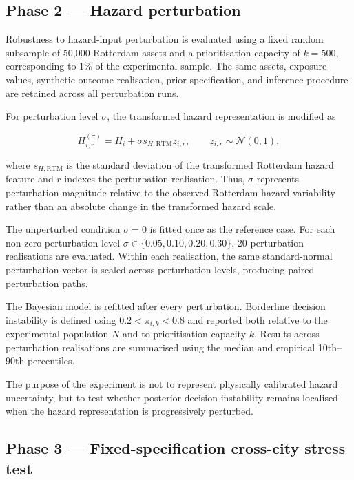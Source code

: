 \documentclass[
]{article}
\begin{document}
\subsection{Phase 2 --- Hazard
perturbation}\label{phase-2-hazard-perturbation}

Robustness to hazard-input perturbation is evaluated using a fixed
random subsample of 50,000 Rotterdam assets and a prioritisation
capacity of \(k=500\), corresponding to 1\% of the experimental sample.
The same assets, exposure values, synthetic outcome realisation, prior
specification, and inference procedure are retained across all
perturbation runs.

For perturbation level \(\sigma\), the transformed hazard representation
is modified as

\[
H_{i,r}^{(\sigma)}
=
H_i
+
\sigma s_{H,\mathrm{RTM}} z_{i,r},
\qquad
z_{i,r}\sim\mathcal{N}(0,1),
\]

where \(s_{H,\mathrm{RTM}}\) is the standard deviation of the
transformed Rotterdam hazard feature and \(r\) indexes the perturbation
realisation. Thus, \(\sigma\) represents perturbation magnitude relative
to the observed Rotterdam hazard variability rather than an absolute
change in the transformed hazard scale.

The unperturbed condition \(\sigma=0\) is fitted once as the reference
case. For each non-zero perturbation level
\(\sigma\in\{0.05,0.10,0.20,0.30\}\), 20 perturbation realisations are
evaluated. Within each realisation, the same standard-normal
perturbation vector is scaled across perturbation levels, producing
paired perturbation paths.

The Bayesian model is refitted after every perturbation. Borderline
decision instability is defined using \(0.2 < \pi_{i,k} < 0.8\) and
reported both relative to the experimental population \(N\) and to
prioritisation capacity \(k\). Results across perturbation realisations
are summarised using the median and empirical 10th--90th percentiles.

The purpose of the experiment is not to represent physically calibrated
hazard uncertainty, but to test whether posterior decision instability
remains localised when the hazard representation is progressively
perturbed.

\subsection{Phase 3 --- Fixed-specification cross-city stress
test}\label{phase-3-fixed-specification-cross-city-stress-test}
\end{document}
